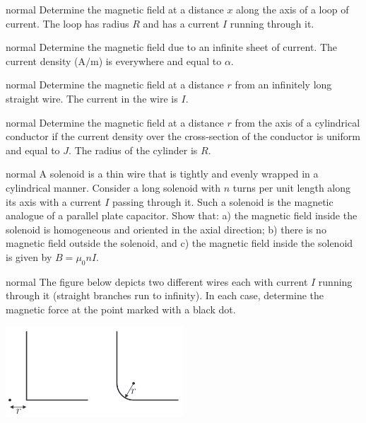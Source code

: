 \hypertarget{P116}{}
\begin{solution}{normal} %
Determine the magnetic field at a distance $x$ along the axis of a loop of current. The loop has radius $R$ and has a current $I$ running through it.
\end{solution}

\hypertarget{P117}{}
\begin{solution}{normal} %
Determine the magnetic field due to an infinite sheet of current. The current density ($\text{A}/\text{m}$) is everywhere and equal to $\alpha$.
\end{solution}

\hypertarget{P118}{}
\begin{solution}{normal} %
Determine the magnetic field at a distance $r$ from an infinitely long straight wire. The current in the wire is $I$.
\end{solution}

\hypertarget{P119}{}
\begin{solution}{normal} %
Determine the magnetic field at a distance $r$ from the axis of a cylindrical conductor if the current density over the cross-section of the conductor is uniform and equal to $J$. The radius of the cylinder is $R$.
\end{solution}

\hypertarget{P120}{}
\begin{solution}{normal} %
A solenoid is a thin wire that is tightly and evenly wrapped in a cylindrical manner. Consider a long solenoid with $n$ turns per unit length along its axis with a current $I$ passing through it. Such a solenoid is the magnetic analogue of a parallel plate capacitor. Show that: a) the magnetic field inside the solenoid is homogeneous and oriented in the axial direction; b) there is no magnetic field outside the solenoid, and c) the magnetic field inside the solenoid is given by $B=\mu_0nI$.
\end{solution}

\hypertarget{P121}{}
\begin{solution}{normal} %
The figure below depicts two different wires each with current $I$ running through it (straight branches run to infinity). In each case, determine the magnetic force at the point marked with a black dot.
\begin{center}
    \includegraphics[width=0.5\textwidth]{S4 Figures/S4-121.png}
\end{center}
\end{solution}

